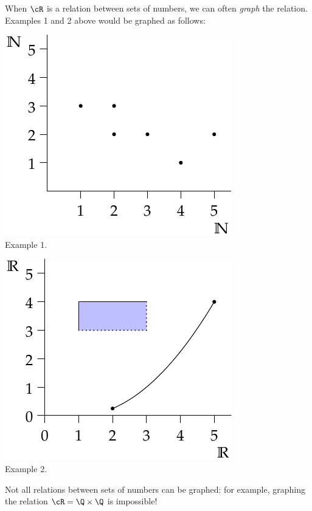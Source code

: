When $\cR$ is a relation between sets of numbers, we can often \emph{graph} the relation. Examples 1 and 2 above would be graphed as follows:
\begin{center}
\begin{minipage}{0.3\textwidth}\centering
\includegraphics[width=\textwidth]{relations-01-reln1}\\
Example 1.
\end{minipage}\qquad\qquad\qquad
\begin{minipage}{0.3\textwidth}\centering
\includegraphics[width=\textwidth]{relations-02-reln2}\\
Example 2.
\end{minipage}
\end{center}
Not all relations between sets of numbers can be graphed: for example, graphing the relation $\cR=\Q\times\Q$ is impossible!\\


